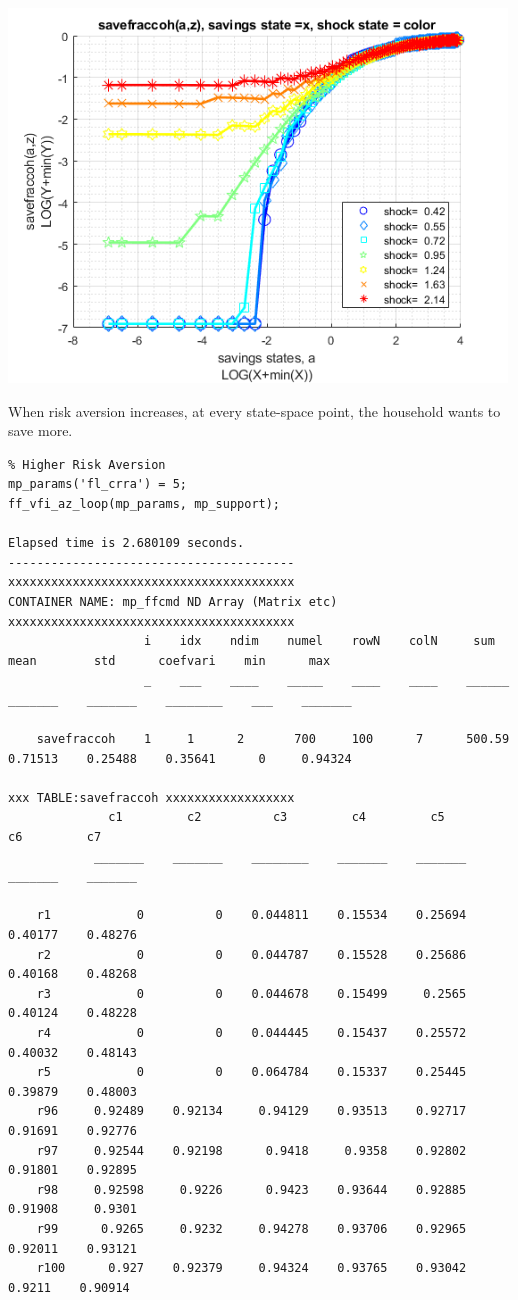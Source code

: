 \documentclass[
]{book}
\begin{document}
\includegraphics[width=5.20833in,height=\textheight]{img/fx_vfi_az_loop_images/figure_3.png}

When risk aversion increases, at every state-space point, the household
wants to save more.

\begin{verbatim}
% Higher Risk Aversion
mp_params('fl_crra') = 5;
ff_vfi_az_loop(mp_params, mp_support);

Elapsed time is 2.680109 seconds.
----------------------------------------
xxxxxxxxxxxxxxxxxxxxxxxxxxxxxxxxxxxxxxxx
CONTAINER NAME: mp_ffcmd ND Array (Matrix etc)
xxxxxxxxxxxxxxxxxxxxxxxxxxxxxxxxxxxxxxxx
                   i    idx    ndim    numel    rowN    colN     sum       mean        std      coefvari    min      max  
                   _    ___    ____    _____    ____    ____    ______    _______    _______    ________    ___    _______

    savefraccoh    1     1      2       700     100      7      500.59    0.71513    0.25488    0.35641      0     0.94324

xxx TABLE:savefraccoh xxxxxxxxxxxxxxxxxx
              c1         c2          c3         c4         c5         c6         c7   
            _______    _______    ________    _______    _______    _______    _______

    r1            0          0    0.044811    0.15534    0.25694    0.40177    0.48276
    r2            0          0    0.044787    0.15528    0.25686    0.40168    0.48268
    r3            0          0    0.044678    0.15499     0.2565    0.40124    0.48228
    r4            0          0    0.044445    0.15437    0.25572    0.40032    0.48143
    r5            0          0    0.064784    0.15337    0.25445    0.39879    0.48003
    r96     0.92489    0.92134     0.94129    0.93513    0.92717    0.91691    0.92776
    r97     0.92544    0.92198      0.9418     0.9358    0.92802    0.91801    0.92895
    r98     0.92598     0.9226      0.9423    0.93644    0.92885    0.91908     0.9301
    r99      0.9265     0.9232     0.94278    0.93706    0.92965    0.92011    0.93121
    r100      0.927    0.92379     0.94324    0.93765    0.93042     0.9211    0.90914
\end{verbatim}
\end{document}
